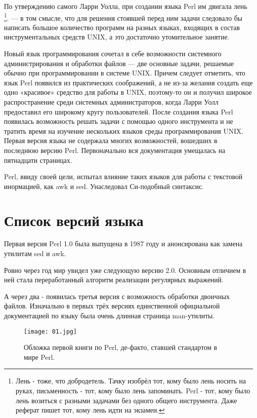 \documentclass[spec, och, referat, times]{SCWorks}
\begin{document}
По утверждению самого Ларри Уолла, при создании языка Perl им двигала лень \footnote[1]{Лень - тоже, что добродетель. Тачку изобрёл тот, кому было лень носить на руках, письменность - тот, кому было лень запоминать. Perl - тот, кому было лень возиться с разными задачами без одного общего инструмента. Даже реферат пишет тот, кому лень идти на экзамен.}. — в том смысле, что для решения стоявшей перед ним задачи следовало бы написать большое количество программ на разных языках, входящих в состав инструментальных средств UNIX, а это достаточно утомительное занятие.

Новый язык программирования сочетал в себе возможности системного администрирования и обработки файлов — две основные задачи, решаемые обычно при программировании в системе UNIX. Причем следует отметить, что язык Perl появился из практических соображений, а не из-за желания создать еще одно «красивое» средство для работы в UNIX, поэтому-то он и получил широкое распространение среди системных администраторов, когда Ларри Уолл предоставил его широкому кругу пользователей. После создания языка Perl появилась возможность решать задачи с помощью одного инструмента и не тратить время на изучение нескольких языков среды программирования UNIX.
Первая версия языка не содержала многих возможностей, вошедших в последнюю версию Perl. Первоначально вся документация умещалась на пятнадцати страницах.

Perl, ввиду своей цели, испытал влияние таких языков для работы с текстовой инормацией, как awk и sed. Унаследовал Си-подобный синтаксис.

\section{Список версий языка}
Первая версия Perl 1.0 была выпущена в 1987 году и анонсирована как замена утилитам sed и awk.

Ровно через год мир увидел уже следующую версию 2.0. Основным отличием в ней стала переработанный алгоритм реализации регулярных выражений.

А через два - появилась третья версия с возможность обработки двоичных файлов. Изначально в первых трёх версиях единственной официальной документацией по языку была очень длинная страница man-утилиты.

\begin{figure}[!ht]
	\centering
    \texttt{[image: 01.jpg]}
	\caption{Обложка первой книги по Perl, де-факто, ставшей стандартом в мире Perl.}
\end{figure}
\end{document}
